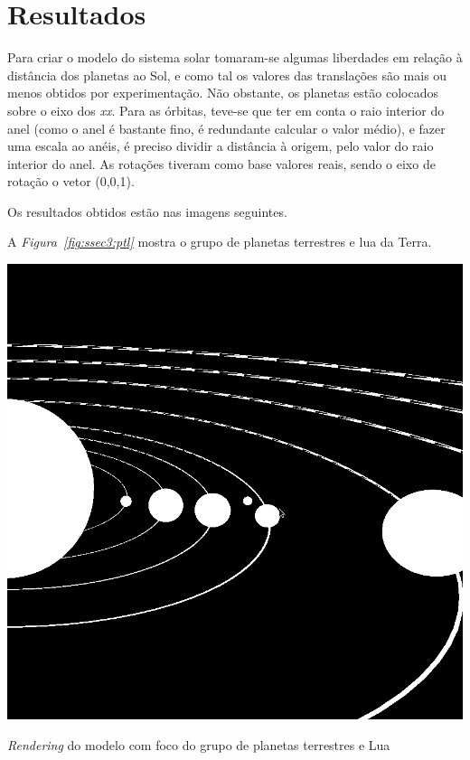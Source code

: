 \section{Resultados}


Para criar o modelo do sistema solar tomaram-se algumas liberdades em relação
à distância dos planetas ao Sol, e como tal os valores das translações são mais
ou menos obtidos por experimentação. Não obstante,  os planetas estão colocados
sobre o eixo dos \emph{xx}. Para as órbitas, teve-se que ter em conta
o raio interior do anel (como o anel é bastante fino, é redundante calcular
o valor médio), e fazer uma escala ao anéis, é preciso dividir a distância
à origem, pelo valor do raio interior do anel. As rotações tiveram como base
valores reais, sendo o eixo de rotação o vetor (0,0,1).


Os resultados obtidos estão nas imagens seguintes.


A \emph{Figura~\ref{fig:ssec3:ptl}} mostra o grupo de planetas terrestres e lua
da Terra. 

\begin{center}
 	
 	\includegraphics[width=\textwidth,height=\textheight,keepaspectratio]{resources/pormenorTerrestres.png}
 	\captionsetup{type=figure, width=0.8\linewidth}
	\caption{\textit{Rendering} do modelo com foco do grupo de planetas terrestres e Lua}
\label{fig:ssec3:ptl} 
\end{center}



